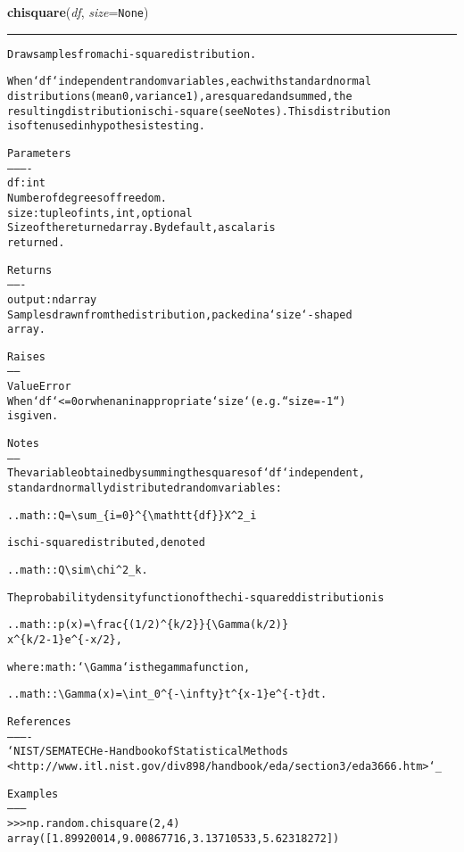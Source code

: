 \hspace{.8\funcindent}\begin{boxedminipage}{\funcwidth}

    \raggedright \textbf{chisquare}(\textit{df}, \textit{size}={\tt None})

    \vspace{-1.5ex}

    \rule{\textwidth}{0.5\fboxrule}
\setlength{\parskip}{2ex}
\begin{alltt}
Draw samples from a chi-square distribution.

When `df` independent random variables, each with standard normal
distributions (mean 0, variance 1), are squared and summed, the
resulting distribution is chi-square (see Notes).  This distribution
is often used in hypothesis testing.

Parameters
----------
df : int
     Number of degrees of freedom.
size : tuple of ints, int, optional
     Size of the returned array.  By default, a scalar is
     returned.

Returns
-------
output : ndarray
    Samples drawn from the distribution, packed in a `size`-shaped
    array.

Raises
------
ValueError
    When `df` {\textless}= 0 or when an inappropriate `size` (e.g. ``size=-1``)
    is given.

Notes
-----
The variable obtained by summing the squares of `df` independent,
standard normally distributed random variables:

.. math:: Q = {\textbackslash}sum\_\{i=0\}{\textasciicircum}\{{\textbackslash}mathtt\{df\}\} X{\textasciicircum}2\_i

is chi-square distributed, denoted

.. math:: Q {\textbackslash}sim {\textbackslash}chi{\textasciicircum}2\_k.

The probability density function of the chi-squared distribution is

.. math:: p(x) = {\textbackslash}frac\{(1/2){\textasciicircum}\{k/2\}\}\{{\textbackslash}Gamma(k/2)\}
                 x{\textasciicircum}\{k/2 - 1\} e{\textasciicircum}\{-x/2\},

where :math:`{\textbackslash}Gamma` is the gamma function,

.. math:: {\textbackslash}Gamma(x) = {\textbackslash}int\_0{\textasciicircum}\{-{\textbackslash}infty\} t{\textasciicircum}\{x - 1\} e{\textasciicircum}\{-t\} dt.

References
----------
`NIST/SEMATECH e-Handbook of Statistical Methods
{\textless}http://www.itl.nist.gov/div898/handbook/eda/section3/eda3666.htm{\textgreater}`\_

Examples
--------
{\textgreater}{\textgreater}{\textgreater} np.random.chisquare(2,4)
array([ 1.89920014,  9.00867716,  3.13710533,  5.62318272])
\end{alltt}

\setlength{\parskip}{1ex}
    \end{boxedminipage}

